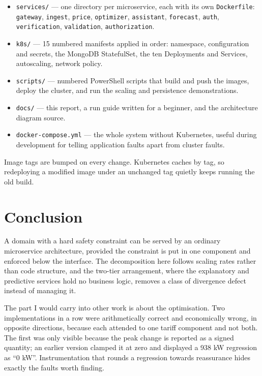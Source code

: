 \documentclass[conference]{IEEEtran}
\begin{document}
\begin{itemize}\itemsep2pt
  \item \texttt{services/} --- one directory per microservice, each with its own
        \texttt{Dockerfile}: \texttt{gateway}, \texttt{ingest}, \texttt{price},
        \texttt{optimizer}, \texttt{assistant}, \texttt{forecast}, \texttt{auth},
        \texttt{verification}, \texttt{validation}, \texttt{authorization}.
  \item \texttt{k8s/} --- 15 numbered manifests applied in order: namespace,
        configuration and secrets, the MongoDB StatefulSet, the ten Deployments
        and Services, autoscaling, network policy.
  \item \texttt{scripts/} --- numbered PowerShell scripts that build and push
        the images, deploy the cluster, and run the scaling and persistence
        demonstrations.
  \item \texttt{docs/} --- this report, a run guide written for a beginner, and
        the architecture diagram source.
  \item \texttt{docker-compose.yml} --- the whole system without Kubernetes,
        useful during development for telling application faults apart from
        cluster faults.
\end{itemize}

Image tags are bumped on every change. Kubernetes caches by tag, so redeploying
a modified image under an unchanged tag quietly keeps running the old build.

\section{Conclusion}

A domain with a hard safety constraint can be served by an ordinary microservice
architecture, provided the constraint is put in one component and enforced below
the interface. The decomposition here follows scaling rates rather than code
structure, and the two-tier arrangement, where the explanatory and predictive
services hold no business logic, removes a class of divergence defect instead of
managing it.

The part I would carry into other work is about the optimisation. Two
implementations in a row were arithmetically correct and economically wrong, in
opposite directions, because each attended to one tariff component and not both.
The first was only visible because the peak change is reported as a signed
quantity; an earlier version clamped it at zero and displayed a 938 kW
regression as ``0 kW''. Instrumentation that rounds a regression towards
reassurance hides exactly the faults worth finding.
\end{document}

